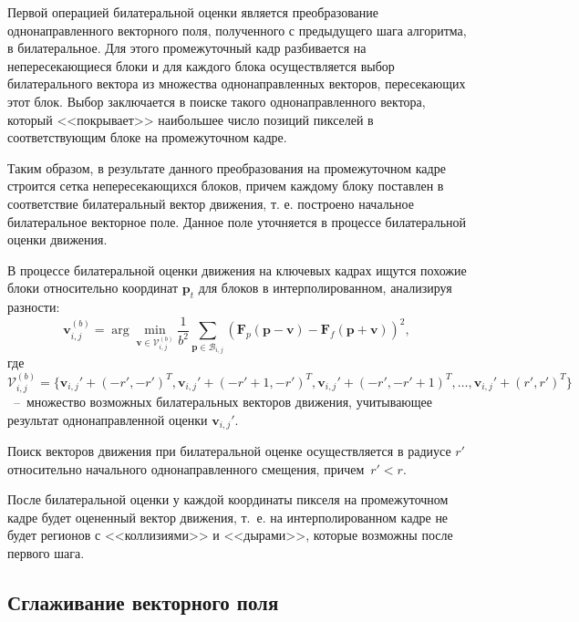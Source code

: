 Первой операцией билатеральной оценки является преобразование однонаправленного векторного поля, полученного с предыдущего шага алгоритма, в билатеральное. Для этого промежуточный кадр разбивается на непересекающиеся блоки и для каждого блока осуществляется выбор билатерального вектора из множества однонаправленных векторов, пересекающих этот блок. Выбор заключается в поиске такого однонаправленного вектора, который <<покрывает>> наибольшее число позиций пикселей в соответствующим блоке на промежуточном кадре.

Таким образом, в результате данного преобразования на промежуточном кадре строится сетка непересекающихся блоков, причем каждому блоку поставлен в соответствие билатеральный вектор движения, т. е. построено начальное билатеральное векторное поле. Данное поле уточняется в процессе билатеральной оценки движения.

В процессе билатеральной оценки движения на ключевых кадрах ищутся похожие блоки относительно координат $\mathbf{p}_t$ для блоков в интерполированном, анализируя разности:
\begin{equation}
\mathbf{v}_{i,j}^{(b)} = \arg\min_{\mathbf{v} \in \mathcal{V}_{i,j}^{(b)}} \frac{1}{b^2} \sum\limits_{\mathbf{p} \in \mathcal{B}_{i,j}} (\mathbf{F}_p(\mathbf{p}-\mathbf{v}) - \mathbf{F}_f(\mathbf{p}+\mathbf{v}))^2,
\label{eq:MSEDiscover}
\end{equation}
где $\mathcal{V}_{i,j}^{(b)}=\{ \mathbf{v}_{i,j}'+(-r',-r')^T, \mathbf{v}_{i,j}'+(-r'+1,-r')^T, \mathbf{v}_{i,j}'+(-r',-r'+1)^T,\ldots, \mathbf{v}_{i,j}'+(r',r')^T \}$~--~множество возможных билатеральных векторов движения, учитывающее результат однонаправленной оценки $\mathbf{v}_{i,j}'$.

Поиск векторов движения при билатеральной оценке осуществляется в радиусе $r'$ относительно начального однонаправленного смещения, причем~$r'<r$.

После билатеральной оценки у каждой координаты пикселя на промежуточном кадре будет оцененный вектор движения, т.~е. на интерполированном кадре не будет регионов с <<коллизиями>> и <<дырами>>, которые возможны после первого шага.
 
\subsection{Сглаживание векторного поля}

